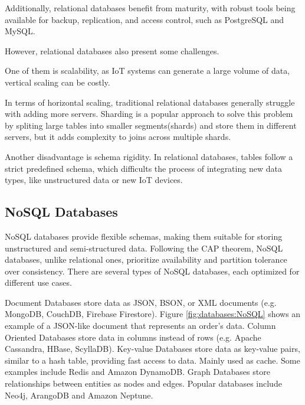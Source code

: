 Additionally, relational databases benefit from maturity, with robust tools being
available for backup, replication, and access control, such as PostgreSQL and MySQL.

However, relational databases also present some challenges.

One of them is scalability, as \gls{IoT} systems can generate a large volume of
data, vertical scaling can be costly.

In terms of horizontal scaling, traditional relational databases generally
struggle with adding more servers. Sharding is a popular approach to
solve this problem by spliting large tables into smaller segments(shards)
and store them in different servers, but it adds complexity to joins
across multiple shards.

Another disadvantage is schema rigidity.
In relational databases, tables follow a strict predefined schema, which
difficults the process of integrating new data types, like unstructured
data or new \gls{IoT} devices.



\subsection{NoSQL Databases}
\gls{NoSQL} databases provide flexible schemas, making them suitable
for storing unstructured and semi-structured data. Following the \gls{CAP} theorem,
\gls{NoSQL} databases, unlike relational ones, prioritize availability and partition
tolerance over consistency. There are several types of \gls{NoSQL} databases,
each optimized for different use cases.

Document Databases store data as \gls{JSON}, \gls{BSON}, or \gls{XML} documents (e.g.
MongoDB, CouchDB, Firebase Firestore). Figure \ref{fig:databases:NoSQL}
shows an example of a \gls{JSON}-like document that represents an order's data.
Column Oriented Databases store data in columns instead of rows (e.g.
Apache Cassandra, HBase, ScyllaDB).
Key-value Databases store data as key-value pairs, similar to
a hash table, providing fast access to data. Mainly used as cache. Some
examples include Redis and Amazon DynamoDB.
Graph Databases store relationships between entities as nodes and
edges. Popular databases include Neo4j, ArangoDB and Amazon Neptune.

